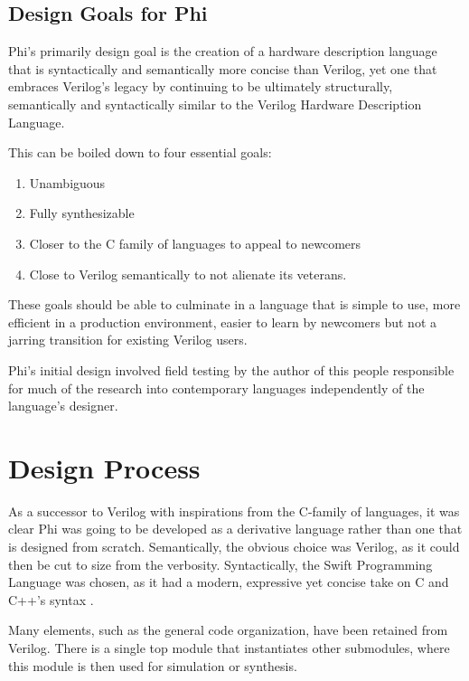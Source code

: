 \documentclass[10pt, two column]{article}
\theoremstyle{definition}
\begin{document}
\subsection{Design Goals for Phi}
Phi’s primarily design goal is the creation of a hardware description language that is syntactically and semantically more concise than Verilog, yet one that embraces Verilog’s legacy by continuing to be ultimately structurally, semantically and syntactically similar to the Verilog Hardware Description Language.\par

This can be boiled down to four essential goals:
\begin{enumerate}[label=\alph*)]
\item Unambiguous
\item Fully synthesizable
\item Closer to the C family of languages to appeal to newcomers
\item Close to Verilog semantically to not alienate its veterans.
\end{enumerate}

These goals should be able to culminate in a language that is simple to use, more efficient in a production environment, easier to learn by newcomers but not a jarring transition for existing Verilog users.

Phi's initial design involved field testing by the author of this people responsible for much of the research into contemporary languages independently of the language's designer.

\section{Design Process}
As a successor to Verilog with inspirations from the C-family of languages, it was clear Phi was going to be developed as a derivative language rather than one that is designed from scratch. Semantically, the obvious choice was Verilog, as it could then be cut to size from the verbosity. Syntactically, the Swift Programming Language was chosen, as it had a modern, expressive yet concise take on C and C++’s syntax \cite{swiftProgLang2019}.\par
 
Many elements, such as the general code organization, have been retained from Verilog. There is a single top module that instantiates other submodules, where this module is then used for simulation or synthesis.\par 
\end{document}
